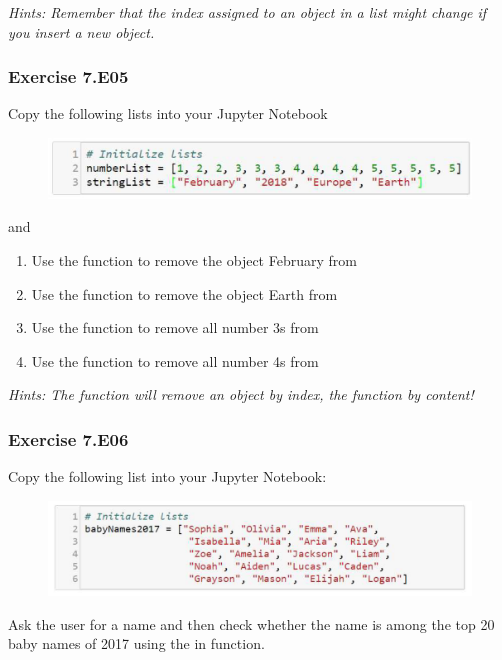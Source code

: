 \textit{Hints:
Remember that the index assigned to an object in a list might change if you insert a new
object.}\\[1cm]



\newpage
\subsubsection*{Exercise 7.E05}
Copy the following lists into your Jupyter Notebook
\begin{figure}[H]
		\centering
		\includegraphics[width=\textwidth]{../IMG/7E05.png} 
\end{figure}
and
\begin{enumerate}[label=(\alph*)]
	\item Use the {} function to remove the object February from {}\\
	\item Use the {} function to remove the object Earth from {}\\
	\item Use the {} function to remove all number 3s from {}\\
	\item Use the {} function to remove all number 4s from {}\\
\end{enumerate}

\textit{
Hints:
The {} function will remove an object by index, the {} function by content!}\\[1cm]




\subsubsection*{Exercise 7.E06}
Copy the following list into your Jupyter Notebook:
\begin{figure}[H]
		\centering
		\includegraphics[width=\textwidth]{../IMG/7E06.png} 
\end{figure}
Ask the user for a name and then check whether the name is among the top 20 baby names
of 2017 using the in function.\\


